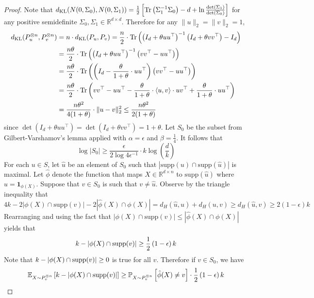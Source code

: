\begin{proof}
Note that $d_{\text{KL}}(N(0, \Sigma_0), N(0, \Sigma_1)) = \frac{1}{2} \left[ \text{Tr}\left( \Sigma_1^{-1} \Sigma_0 \right) - d + \ln \frac{\det(\Sigma_1)}{\det(\Sigma_0)} \right]$ for any positive semidefinite $\Sigma_0, \Sigma_1 \in \mathbb{R}^{d\times d}$. Therefore for any $\| u \|_2 = \| v \|_2 = 1$,
\begin{align*}
d_{\text{KL}}(P_u^{\otimes n}, P_v^{\otimes n}) &= n \cdot d_{\text{KL}}(P_u, P_v) = \frac{n}{2} \cdot \text{Tr}\left( \left(I_d + \theta uu^\top \right)^{-1} \left(I_d + \theta vv^\top \right) - I_d \right) \\
&= \frac{n\theta}{2} \cdot \text{Tr}\left( \left( I_d + \theta uu^\top \right)^{-1}\left( vv^\top - uu^\top \right) \right) \\
&= \frac{n\theta}{2} \cdot \text{Tr}\left( \left( I_d - \frac{\theta}{1 + \theta} \cdot uu^\top \right) \left( vv^\top - uu^\top \right) \right) \\
&= \frac{n\theta}{2} \cdot \text{Tr}\left(vv^\top - uu^\top - \frac{\theta}{1 + \theta} \cdot \langle u, v \rangle \cdot uv^\top + \frac{\theta}{1 + \theta} \cdot uu^\top \right) \\
&= \frac{n\theta^2}{4(1 + \theta)} \cdot \| u - v \|_2^2 \le \frac{n\theta^2}{2(1 + \theta)}
\end{align*}
since $\det(I_d + \theta uu^\top) = \det(I_d + \theta vv^\top) = 1 + \theta$. Let $S_0$ be the subset from Gilbert-Varshamov's lemma applied with $\alpha = \epsilon$ and $\beta = \frac{1}{4}$. It follows that
$$\log |S_0| \ge \frac{\epsilon}{2\log 4\epsilon^{-1}} \cdot k \log \left( \frac{d}{k} \right)$$
For each $u \in S$, let $\hat{u}$ be an element of $S_0$ such that $|\text{supp}(u) \cap \text{supp}(\hat{u})|$ is maximal. Let $\hat{\phi}$ denote the function that maps $X \in \mathbb{R}^{d \times n}$ to $\text{supp}(\hat{u})$ where $u = \mathbf{1}_{\phi(X)}$. Suppose that $v \in S_0$ is such that $v \neq \hat{u}$. Observe by the triangle inequality that
$$4k - 2|\phi(X) \cap \text{supp}(v)| - 2|\hat{\phi}(X) \cap \phi(X)| = d_H(\hat{u}, u) + d_H(u, v) \ge d_H(\hat{u}, v) \ge 2(1 - \epsilon) k$$
Rearranging and using the fact that $|\phi(X) \cap \text{supp}(v)| \le |\hat{\phi}(X) \cap \phi(X)|$ yields that
$$k - |\phi(X) \cap \textnormal{supp}(v)| \ge \frac{1}{2} \left( 1 - \epsilon \right) k$$
Note that $k - |\phi(X) \cap \textnormal{supp}(v)| \ge 0$ is true for all $v$. Therefore if $v \in S_0$, we have
$$\mathbb{E}_{X \sim P_v^{\otimes n}} \left[ k - |\phi(X) \cap \textnormal{supp}(v)| \right] \ge \mathbb{P}_{X \sim P_{v}^{\otimes n}} \left[ \hat{\phi}(X) \neq v \right] \cdot \frac{1}{2} \left( 1 - \epsilon \right)k$$

\end{proof}
